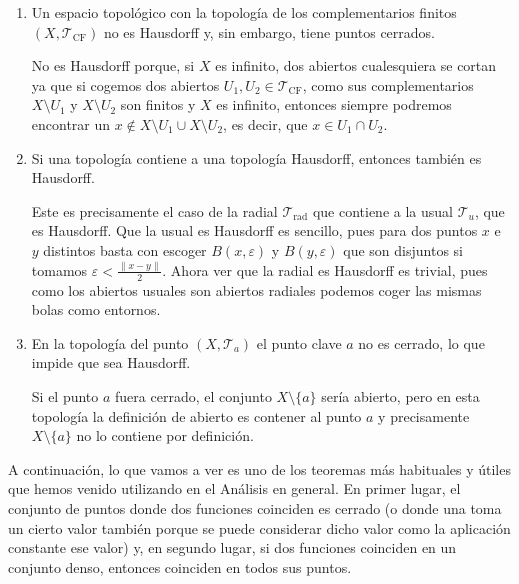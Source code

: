 \begin{obs}
\begin{enumerate}
    \item Un espacio topológico con la topología de los complementarios finitos $\left( X, \mathcal{T}_{\text{CF}} \right)$ no es Hausdorff y, sin embargo, tiene puntos cerrados.
    
    No es Hausdorff porque, si $X$ es infinito, dos abiertos cualesquiera se cortan ya que si cogemos dos abiertos $U_1, U_2 \in \mathcal{T}_{\text{CF}}$, como sus complementarios $X \setminus U_1$ y $X \setminus U_2$ son finitos y $X$ es infinito, entonces siempre podremos encontrar un $x \not\in X \setminus U_1 \cup X \setminus U_2$, es decir, que $x \in U_1 \cap U_2$. 

    \item Si una topología contiene a una topología Hausdorff, entonces también es Hausdorff.
    
    Este es precisamente el caso de la radial $\mathcal{T}_{\text{rad}}$ que contiene a la usual $\mathcal{T}_{u}$, que es Hausdorff.
	Que la usual es Hausdorff es sencillo, pues para dos puntos $x$ e $y$ distintos basta con escoger $B\left( x, \varepsilon \right)$ y $B\left( y, \varepsilon \right)$ que son disjuntos si tomamos $\varepsilon < \frac{\lVert x - y \rVert}{2}$. Ahora ver que la radial es Hausdorff es trivial, pues como los abiertos usuales son abiertos radiales podemos coger las mismas bolas como entornos.

    \item En la topología del punto $\left( X, \mathcal{T}_a \right)$ el punto clave $a$ no es cerrado, lo que impide que sea Hausdorff. 
    
    Si el punto $a$ fuera cerrado, el conjunto $X\setminus\{a\}$ sería abierto, pero en esta topología la definición de abierto es contener al punto $a$ y precisamente $X\setminus\{a\}$ no lo contiene por definición.
\end{enumerate}
\end{obs}

A continuación, lo que vamos a ver es uno de los teoremas más habituales y útiles que hemos venido utilizando en el Análisis en general. En primer lugar, el conjunto de puntos donde dos funciones coinciden es cerrado (o donde una toma un cierto valor también porque se puede considerar dicho valor como la aplicación constante ese valor) y, en segundo lugar, si dos funciones coinciden en un conjunto denso, entonces coinciden en todos sus puntos.

